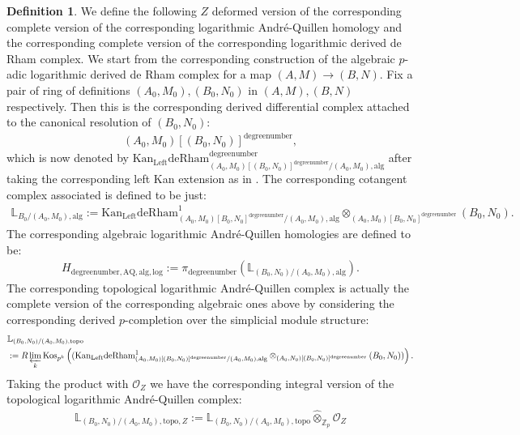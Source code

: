 \documentclass[11pt]{book}
\theoremstyle{definition}
\newtheorem{definition}[theorem]{Definition}
\numberwithin{equation}{section}
\begin{document}
\begin{definition}
We define the following $Z$ deformed version of the corresponding complete version of the corresponding logarithmic Andr\'e-Quillen homology and the corresponding complete version of the corresponding logarithmic derived de Rham complex. We start from the corresponding construction of the algebraic $p$-adic logarithmic derived de Rham complex for a map $(A,M)\rightarrow (B,N)$. Fix a pair of ring of definitions $(A_0,M_0),(B_0,N_0)$ in $(A,M),(B,N)$ respectively. Then this is the corresponding derived differential complex attached to the canonical resolution of $(B_0,N_0)$:
\begin{align}
(A_0,M_0)[(B_0,N_0)]^\text{degreenumber},	
\end{align}
which is now denoted by $\mathrm{Kan}_\mathrm{Left}\mathrm{deRham}^\text{degreenumber}_{(A_0,M_0)[(B_0,N_0)]^\text{degreenumber}/(A_0,M_0),\mathrm{alg}}$ after taking the corresponding left Kan extension as in \cite[Chapter 6]{12B1}. The corresponding cotangent complex associated is defined to be just:
\begin{align}
\mathbb{L}_{B_0/(A_0,M_0),\mathrm{alg}}:=	\mathrm{Kan}_\mathrm{Left}\mathrm{deRham}^1_{(A_0,M_0)[B_0,N_0]^\text{degreenumber}/(A_0,M_0),\mathrm{alg}}\otimes_{(A_0,M_0)[B_0,N_0]^\text{degreenumber}} (B_0,N_0).
\end{align}
The corresponding algebraic logarithmic Andr\'e-Quillen homologies are defined to be:
\begin{align}
H_{\text{degreenumber},{\mathrm{AQ}},\mathrm{alg,log}}:=\pi_\text{degreenumber} (\mathbb{L}_{(B_0,N_0)/(A_0,M_0),\mathrm{alg}}). 	
\end{align}
The corresponding topological logarithmic Andr\'e-Quillen complex is actually the complete version of the corresponding algebraic ones above by considering the corresponding derived $p$-completion over the simplicial module structure:
\begin{align}
&\mathbb{L}_{(B_0,N_0)/(A_0,M_0),\mathrm{topo}}\\
&:=R\varprojlim_k\mathrm{Kos}_{p^k}	\left((\mathrm{Kan}_\mathrm{Left}\mathrm{deRham}^1_{(A_0,M_0)[(B_0,N_0)]^\text{degreenumber}/(A_0,M_0),\mathrm{alg}}\otimes_{(A_0,N_0)[(B_0,N_0)]^\text{degreenumber}} (B_0,N_0))\right).
\end{align}
Taking the product with $\mathcal{O}_Z$ we have the corresponding integral version of the topological logarithmic Andr\'e-Quillen complex:
\begin{align}
\mathbb{L}_{(B_0,N_0)/(A_0,M_0),\mathrm{topo},Z}:=\mathbb{L}_{(B_0,N_0)/(A_0,M_0),\mathrm{topo}}\widehat{\otimes}_{\mathbb{Z}_p}\mathcal{O}_Z

\end{align}
\end{definition}
\end{document}
